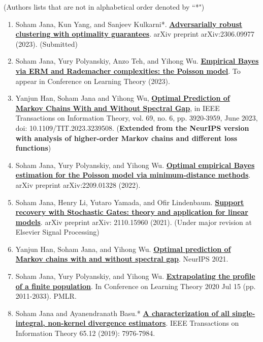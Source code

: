 \documentclass[letterpaper,11pt,oneside]{article}
\theoremstyle{definition}
\begin{document}
	 (Authors lists that are not in alphabetical order denoted by ``*")
	
	\begin{enumerate}
		

		\item Soham Jana, Kun Yang, and Sanjeev Kulkarni*. \href{https://arxiv.org/abs/2306.09977}{\bf Adversarially robust clustering with optimality guarantees}. arXiv preprint arXiv:2306.09977 (2023). (Submitted)
		
		\item Soham Jana, Yury Polyanskiy, Anzo Teh, and Yihong Wu. \href{https://arxiv.org/abs/2307.02070}{\bf Empirical Bayes via ERM and Rademacher complexities: the Poisson model}. To appear in Conference on Learning Theory (2023).
		
		
		\item Yanjun Han, Soham Jana and Yihong Wu, \href{https://ieeexplore.ieee.org/abstract/document/10028667}{\bf Optimal Prediction of Markov Chains With and Without Spectral Gap}, in IEEE Transactions on Information Theory, vol. 69, no. 6, pp. 3920-3959, June 2023, doi: 10.1109/TIT.2023.3239508. (\textbf{Extended from the NeurIPS version with analysis of higher-order Markov chains and different loss functions})
		
		\item Soham Jana, Yury Polyanskiy, and Yihong Wu. \href{https://arxiv.org/abs/2209.01328}{\bf Optimal empirical Bayes estimation for the Poisson model via minimum-distance methods}. arXiv preprint arXiv:2209.01328 (2022).
		
		\item Soham Jana, Henry Li, Yutaro Yamada, and Ofir Lindenbaum. {\bf \href{https://arxiv.org/abs/2110.15960}{\bf Support recovery with Stochastic Gates: theory and application for linear models}}. arXiv preprint arXiv: 2110.15960 (2021). (Under major revision at Elsevier Signal Processing)
		
		\item Yanjun Han, Soham Jana, and Yihong Wu. \href{https://arxiv.org/abs/2106.13947}{\bf Optimal prediction of Markov chains with and without spectral gap}. NeurIPS 2021.
		
		\item Soham Jana, Yury Polyanskiy, and Yihong Wu. \href{https://arxiv.org/abs/2005.10561}{\bf Extrapolating the profile of a finite population}. In Conference on Learning Theory 2020 Jul 15 (pp. 2011-2033). PMLR.
		
		\item Soham Jana and Ayanendranath Basu.* \href{https://janasoham.github.io/files/bregman_charac.pdf}{\bf A characterization of all single-integral, non-kernel divergence estimators}. IEEE Transactions on Information Theory 65.12 (2019): 7976-7984.
		
	\end{enumerate}
\end{document}
